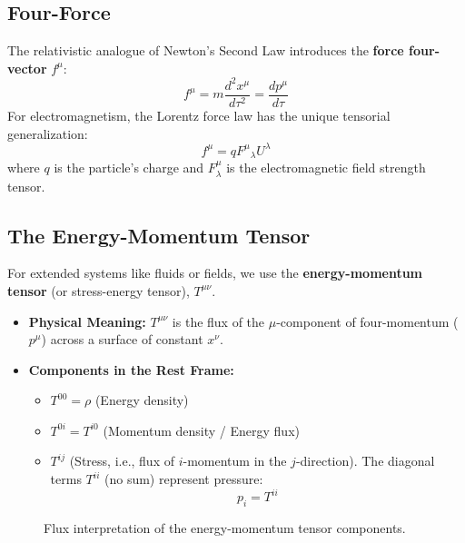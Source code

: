 \documentclass[11pt, a4paper]{report}
\begin{document}
\subsection*{Four-Force}

The relativistic analogue of Newton's Second Law introduces the \textbf{force four-vector} $f^\mu$:
\begin{equation}
    f^\mu = m\frac{d^2 x^\mu}{d\tau^2} = \frac{dp^\mu}{d\tau}
\end{equation}
For electromagnetism, the Lorentz force law has the unique tensorial generalization:
\begin{equation}
    f^\mu = q {F^\mu}_\lambda U^\lambda
\end{equation}
where $q$ is the particle's charge and $F^\mu_\lambda$ is the electromagnetic field strength tensor.

\subsection*{The Energy-Momentum Tensor}

For extended systems like fluids or fields, we use the \textbf{energy-momentum tensor} (or stress-energy tensor), $T^{\mu\nu}$.
\begin{itemize}
    \item \textbf{Physical Meaning:} $T^{\mu\nu}$ is the flux of the $\mu$-component of four-momentum ($p^\mu$) across a surface of constant $x^\nu$.
    \item \textbf{Components in the Rest Frame:}
    \begin{itemize}
        \item $T^{00} = \rho$ (Energy density)
        \item $T^{0i} = T^{i0}$ (Momentum density / Energy flux)
        \item $T^{ij}$ (Stress, i.e., flux of $i$-momentum in the $j$-direction). The diagonal terms $T^{ii}$ (no sum) represent pressure:
        \begin{equation}
            p_i = T^{ii}
        \end{equation}
    \end{itemize}
\end{itemize}
\begin{figure}[h]
\centering
{}
\caption{Flux interpretation of the energy-momentum tensor components.}
\end{figure}
\end{document}
